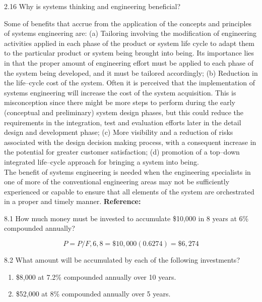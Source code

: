 \begin{exsol@exercise}{2.16}
    \label{sea-2-24}
        Why is systems thinking and engineering beneficial?
\end{exsol@exercise}
\begin{exsol@solution}{}
        Some of benefits that accrue from the application of the concepts and principles of systems engineering are: (a) Tailoring involving the modification of engineering activities applied in each phase of the product or system life cycle to adapt them to the particular product or system being brought into being. Its importance lies in that the proper amount of engineering effort must be applied to each phase of the system being developed, and it must be tailored accordingly; (b) Reduction in the life–cycle cost of the system. Often it is perceived that the implementation of systems engineering will increase the cost of the system acquisition. This is misconception since there might be more steps to perform during the early (conceptual and preliminary) system design phases, but this could reduce the requirements in the integration, test and evaluation efforts later in the detail design and development phase; (c) More visibility and a reduction of risks associated with the design decision making process, with a consequent increase in the potential for greater customer satisfaction; (d) promotion of a top–down integrated life–cycle approach for bringing a system into being. \\
        The benefit of systems engineering is needed when the engineering specialists in one of more of the conventional engineering areas may not be sufficiently experienced or capable to ensure that all elements of the system are orchestrated in a proper and timely manner. \textbf{Reference:}
\end{exsol@solution}
\begin{exsol@exercise}{8.1}
    \label{sea-8-1}
        How much money must be invested to accumulate \$10,000 in 8 years at 6\% compounded annually?
\end{exsol@exercise}
\begin{exsol@solution}{}
        \begin{equation}
            P=P/F,6,8=\$10,000(0.6274)=\$6,274
        \end{equation}
\end{exsol@solution}
\begin{exsol@exercise}{8.2}
    \label{sea-8-2}
        What amount will be accumulated by each of the following investments?
        \begin{enumerate}[label=\alph*)]
            \item \$8,000 at 7.2\% compounded annually over 10 years.
            \item \$52,000 at 8\% compounded annually over 5 years.
        \end{enumerate}
\end{exsol@exercise}
